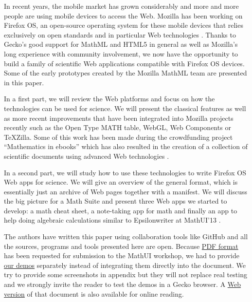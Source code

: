 In recent years, the mobile market has grown considerably and more and more
people are using mobile devices to access the Web. Mozilla has been working
on Firefox OS, an open-source operating system for these mobile devices that
relies exclusively on open standards and in particular Web technologies
\cite{MozillaFirefoxOS}. Thanks to
Gecko's good support for MathML and HTML5 in general as well as
Mozilla's long experience with community involvement, we now have the opportunity
to build a family of scientific Web applications compatible with Firefox OS devices.
Some of the early prototypes created by the Mozilla MathML team are presented
in this paper.

In a first part, we will review the Web platforms and focus on how the
technologies
can be used for science. We will present the classical features
as well as more recent improvements that have been integrated into Mozilla
projects recently such as the Open Type MATH table, WebGL, Web Components or
TeXZilla. Some of this work has been made during the crowdfunding project
``Mathematics in ebooks'' which has also resulted in the creation of a collection
of scientific documents using advanced Web technologies \cite{MathInEbooks}.

In a second
part, we will study how to use these technologies to write Firefox OS Web apps
for science. We will give an overview of the general format, which is
essentially just an archive of Web pages together with a manifest. We will
discuss the big picture for a Math Suite and present three Web apps we started
to develop: a math cheat sheet, a note-taking app for math and finally an app
to help doing algebraic calculations similar to Epsilonwriter at MathUI'13
\cite{Nicaud2}.

The authors have written this paper using collaboration tools like GitHub and
all the sources, programs and tools presented here are open. Because 
\href{http://fred-wang.github.io/MathUI2014/paper/output/MathUI2014-MozillaMathML.pdf}{PDF format}
has been requested for submission to the MathUI workshop, we had to provide
\href{http://fred-wang.github.io/MathUI2014/demos/}{our demos} separately instead of integrating them directly into the document. We try to provide some
screenshots in appendix but they will not replace real testing and
we strongly invite the reader to test the demos in a Gecko browser. A
\href{http://fred-wang.github.io/MathUI2014/paper/output/}{Web version} of that document is also available for online reading.
